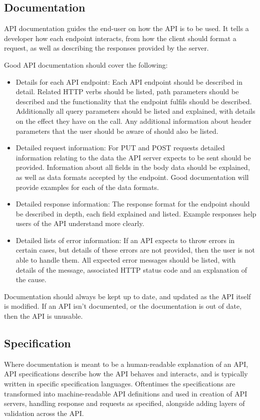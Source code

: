 \subsection{Documentation}
API documentation guides the end-user on how the API is to be used. It tells a developer how each endpoint interacts, from how the client should format a request, as well as describing the responses provided by the server.

Good API documentation should cover the following:
\begin{itemize}
    \item Details for each API endpoint: Each API endpoint should be described in detail. Related HTTP verbs should be listed, path parameters should be described and the functionality that the endpoint fulfils should be described. Additionally all query parameters should be listed and explained, with details on the effect they have on the call. Any additional information about header parameters that the user should be aware of should also be listed.
    \item Detailed request information: For PUT and POST requests detailed information relating to the data the API server expects to be sent should be provided. Information about all fields in the body data should be explained, as well as data formats accepted by the endpoint. Good documentation will provide examples for each of the data formats.
    \item Detailed response information: The response format for the endpoint should be described in depth, each field explained and listed. Example responses help users of the API understand more clearly. 
    \item Detailed lists of error information: If an API expects to throw errors in certain cases, but details of these errors are not provided, then the user is not able to handle them. All expected error messages should be listed, with details of the message, associated HTTP status code and an explanation of the cause. 
\end{itemize}
Documentation should always be kept up to date, and updated as the API itself is modified. If an API isn't documented, or the documentation is out of date, then the API is unusable.

\subsection{Specification}
Where documentation is meant to be a human-readable explanation of an API, API specifications describe how the API behaves and interacts, and is typically written in specific specification languages. Oftentimes the specifications are transformed into machine-readable API definitions and used in creation of API servers, handling response and requests as specified, alongside adding layers of validation across the API.

